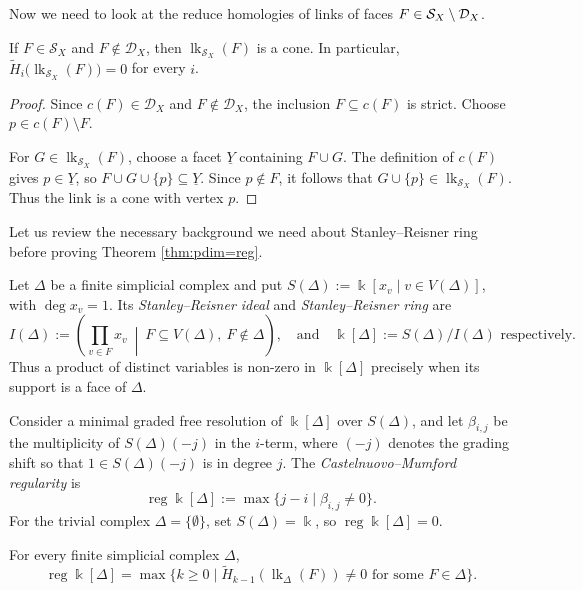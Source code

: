 \documentclass[a4paper,leqno]{amsart}
\begin{document}
Now we need to look at the reduce homologies of links of faces $F\in \mathcal{S}_X\setminus \mathcal D_X$.

\begin{lem}\label{lem:bad face has 0 homology link}
If $F\in\mathcal S_X$ and $F\notin\mathcal D_X$, then $\operatorname{lk}_{\mathcal S_X}(F)$ is a cone. In particular, $\widetilde H_i\bigl(\operatorname{lk}_{\mathcal S_X}(F)\bigr)=0$ for every $i$.
\end{lem}

\begin{proof}
Since $c(F)\in\mathcal D_X$ and $F\notin\mathcal D_X$, the inclusion $F\subseteq c(F)$ is strict. Choose $p\in c(F)\setminus F$.

For $G\in\operatorname{lk}_{\mathcal S_X}(F)$, choose a facet $\underline{Y}$ containing $F\cup G$. The definition of $c(F)$ gives $p\in \underline{Y}$, so $F\cup G\cup\{p\}\subseteq \underline{Y}$. Since $p\notin F$, it follows that $G\cup\{p\}\in\operatorname{lk}_{\mathcal S_X}(F)$. Thus the link is a cone with vertex $p$.
\end{proof}

Let us review the necessary background we need about Stanley--Reisner ring before proving Theorem \ref{thm:pdim=reg}.

\begin{dfn}\label{def:SR ring}
Let $\Delta$ be a finite simplicial complex and put $S(\Delta):=\Bbbk[x_v\mid v\in V(\Delta)]$, with $\deg x_v=1$. Its \emph{Stanley--Reisner ideal} and \emph{Stanley--Reisner ring} are
\[
I(\Delta):=\left(\prod_{v\in F}x_v\ \middle|\ F\subseteq V(\Delta),\ F\notin \Delta\right), \quad \text{and}
\quad \Bbbk[\Delta]:=S(\Delta)/I(\Delta) \text{ respectively}.
\]
Thus a product of distinct variables is non-zero in $\Bbbk[\Delta]$ precisely when its support is a face of $\Delta$.

Consider a minimal graded free resolution of $\Bbbk[\Delta]$ over $S(\Delta)$, and let $\beta_{i,j}$ be the multiplicity of $S(\Delta)(-j)$ in the $i$-term, where $(-j)$ denotes the grading shift so that $1\in S(\Delta)(-j)$ is in degree $j$. The \emph{Castelnuovo--Mumford regularity} is
\[
\operatorname{reg}\Bbbk[\Delta]:=\max\{j-i\mid\beta_{i,j}\neq0\}.
\]
For the trivial complex $\Delta=\{\emptyset\}$, set $S(\Delta)=\Bbbk$, so $\operatorname{reg}\Bbbk[\Delta]=0$.
\end{dfn}

\begin{lem}\label{lem:Hochshster easier}{\rm\cite{HH11}}
For every finite simplicial complex $\Delta$,
\[
\operatorname{reg}\Bbbk[\Delta]
=\max\{k\geq0\mid\widetilde H_{k-1}(\operatorname{lk}_\Delta(F))\neq0
\text{ for some }F\in \Delta\}.
\]
\end{lem}
\end{document}
